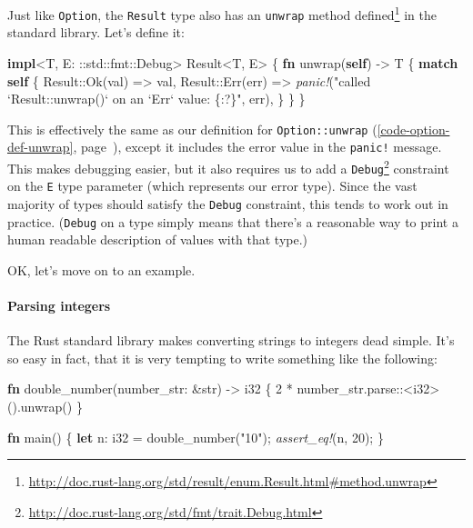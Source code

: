 \documentclass[a4paper,]{book}
\renewcommand*{\hypertarget}[3][\ar]{%
  \def\ar{#2}%
  \label{#1}%
  #3}
\renewcommand*{\hyperlink}[2]{%
 #2 (\autoref{#1}, page~\pageref{#1})}
\newenvironment{Shaded}{\begin{snugshade}}{\end{snugshade}}
\newcommand{\KeywordTok}[1]{\textcolor[rgb]{0.13,0.29,0.53}{\textbf{{#1}}}}
\newcommand{\DataTypeTok}[1]{\textcolor[rgb]{0.13,0.29,0.53}{{#1}}}
\newcommand{\DecValTok}[1]{\textcolor[rgb]{0.00,0.00,0.81}{{#1}}}
\newcommand{\ConstantTok}[1]{\textcolor[rgb]{0.00,0.00,0.00}{{#1}}}
\newcommand{\StringTok}[1]{\textcolor[rgb]{0.31,0.60,0.02}{{#1}}}
\newcommand{\BuiltInTok}[1]{{#1}}
\newcommand{\PreprocessorTok}[1]{\textcolor[rgb]{0.56,0.35,0.01}{\textit{{#1}}}}
\newcommand{\NormalTok}[1]{{#1}}
\renewcommand{\href}[2]{#2\footnote{\url{#1}}}
\let\oldparagraph\paragraph
\renewcommand{\paragraph}[1]{\oldparagraph{#1}\mbox{}}
\begin{document}
Just like \texttt{Option}, the \texttt{Result} type also has an
\href{http://doc.rust-lang.org/std/result/enum.Result.html\#method.unwrap}{\texttt{unwrap}
method defined} in the standard library. Let's define it:

\begin{Shaded}
\begin{Highlighting}[]
\KeywordTok{impl}\NormalTok{<T, E: ::std::fmt::}\BuiltInTok{Debug}\NormalTok{> }\DataTypeTok{Result}\NormalTok{<T, E> \{}
    \KeywordTok{fn} \NormalTok{unwrap(}\KeywordTok{self}\NormalTok{) -> T \{}
        \KeywordTok{match} \KeywordTok{self} \NormalTok{\{}
            \DataTypeTok{Result}\NormalTok{::}\ConstantTok{Ok}\NormalTok{(val) => val,}
            \DataTypeTok{Result}\NormalTok{::}\ConstantTok{Err}\NormalTok{(err) =>}
              \PreprocessorTok{panic!}\NormalTok{(}\StringTok{"called `Result::unwrap()` on an `Err` value: \{:?\}"}\NormalTok{, err),}
        \NormalTok{\}}
    \NormalTok{\}}
\NormalTok{\}}
\end{Highlighting}
\end{Shaded}

This is effectively the same as our
\protect\hyperlink{code-option-def-unwrap}{definition for
\texttt{Option::unwrap}}, except it includes the error value in the
\texttt{panic!} message. This makes debugging easier, but it also
requires us to add a
\href{http://doc.rust-lang.org/std/fmt/trait.Debug.html}{\texttt{Debug}}
constraint on the \texttt{E} type parameter (which represents our error
type). Since the vast majority of types should satisfy the
\texttt{Debug} constraint, this tends to work out in practice.
(\texttt{Debug} on a type simply means that there's a reasonable way to
print a human readable description of values with that type.)

OK, let's move on to an example.

\hypertarget{parsing-integers}{\paragraph{Parsing
integers}\label{parsing-integers}}

The Rust standard library makes converting strings to integers dead
simple. It's so easy in fact, that it is very tempting to write
something like the following:

\begin{Shaded}
\begin{Highlighting}[]
\KeywordTok{fn} \NormalTok{double_number(number_str: &}\DataTypeTok{str}\NormalTok{) -> }\DataTypeTok{i32} \NormalTok{\{}
    \DecValTok{2} \NormalTok{* number_str.parse::<}\DataTypeTok{i32}\NormalTok{>().unwrap()}
\NormalTok{\}}

\KeywordTok{fn} \NormalTok{main() \{}
    \KeywordTok{let} \NormalTok{n: }\DataTypeTok{i32} \NormalTok{= double_number(}\StringTok{"10"}\NormalTok{);}
    \PreprocessorTok{assert_eq!}\NormalTok{(n, }\DecValTok{20}\NormalTok{);}
\NormalTok{\}}
\end{Highlighting}
\end{Shaded}
\end{document}
